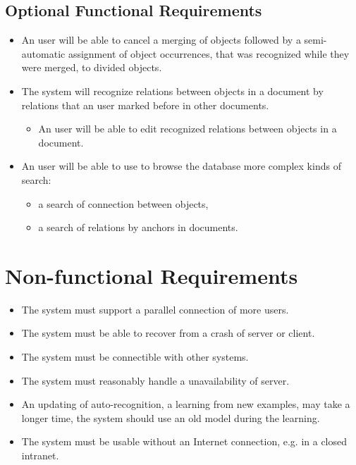 \subsection{Optional Functional Requirements}
\begin{itemize}
	\item An user will be able to cancel a merging of objects followed by
	a semi-automatic assignment of object occurrences, that was recognized while
	they were merged, to divided objects.
	\item The system will recognize relations between objects in a document by
	relations that an user marked before in other documents.
	\begin{itemize}
		\item An user will be able to edit recognized relations between objects
		in a document.
	\end{itemize}
	\item An user will be able to use to browse the database more complex kinds
	of search:
	\begin{itemize}
		\item a search of connection between objects,
		\item a search of relations by anchors in documents.
	\end{itemize}
\end{itemize}

\section{Non-functional Requirements}
\begin{itemize}
	\item The system must support a parallel connection of more users.
	\item The system must be able to recover from a crash of server or client.
	\item The system must be connectible with other systems.
	\item The system must reasonably handle a unavailability of server.
	\item An updating of auto-recognition, a learning from new examples,  may take
	a longer time, the system should use an old model during the learning.
	\item The system must be usable without an Internet connection, e.g. in
	a closed intranet.
\end{itemize}

